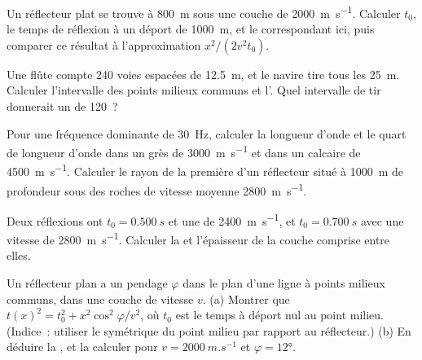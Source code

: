 \begin{exercise}[$\star$]\label{exo:b3:exploration-seismology:2}
Un réflecteur plat se trouve à \qty{800}{m} sous une couche de \qty{2000}{m.s^{-1}}.
Calculer $t_0$, le temps de réflexion à un déport de \qty{1000}{m}, et le 
correspondant ici, puis comparer ce résultat à l'approximation $x^2/(2v^2t_0)$.
\end{exercise}

\begin{exercise}[$\star$]\label{exo:b3:exploration-seismology:3}
Une flûte compte 240 voies espacées de \qty{12.5}{m}, et le navire tire tous les
\qty{25}{m}. Calculer l'intervalle des points milieux communs et l'. Quel intervalle de tir
donnerait un  de 120~?
\end{exercise}

\begin{exercise}[$\star$]\label{exo:b3:exploration-seismology:4}
Pour une fréquence dominante de \qty{30}{Hz}, calculer la longueur d'onde et le
quart de longueur d'onde dans un grès de \qty{3000}{m.s^{-1}} et dans un calcaire de
\qty{4500}{m.s^{-1}}. Calculer le rayon de la première 
d'un réflecteur situé à \qty{1000}{m} de profondeur sous des roches de vitesse moyenne \qty{2800}{m.s^{-1}}.
\end{exercise}

\begin{exercise}[$\star\star$]\label{exo:b3:exploration-seismology:5}
Deux réflexions ont $t_0 = \qty{0.500}{s}$ et une  de
\qty{2400}{m.s^{-1}}, et $t_0 = \qty{0.700}{s}$ avec une vitesse de \qty{2800}{m.s^{-1}}.
Calculer la  et l'épaisseur de la couche comprise entre elles.
\end{exercise}

\begin{exercise}[$\star\star$]\label{exo:b3:exploration-seismology:6}
Un réflecteur plan a un pendage $\varphi$ dans le plan d'une ligne à points milieux communs, dans une couche
de vitesse $v$. (a) Montrer que $t(x)^2 = t_0^2 + x^2\cos^2\varphi/v^2$, où $t_0$ est
le temps à déport nul au point milieu. (Indice~: utiliser le symétrique du point milieu
par rapport au réflecteur.) (b) En déduire la , et la calculer pour
$v = \qty{2000}{m.s^{-1}}$ et $\varphi = \ang{12}$.
\end{exercise}


